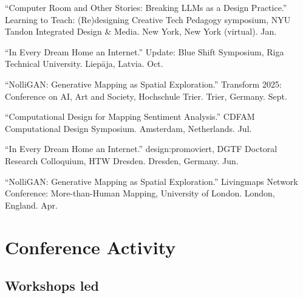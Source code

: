 \documentclass[11pt,letterpaper]{report} %
\begin{document}
\begin{tablist}

\item[2026] \tab{}\enquote{Computer Room and Other Stories: Breaking LLMs as a Design Practice.} Learning to Teach: (Re)designing Creative Tech Pedagogy symposium, NYU Tandon Integrated Design \& Media. New York, New York (virtual). Jan.

\item[2025] \tab{}\enquote{In Every Dream Home an Internet.} Update: Blue Shift Symposium, Riga Technical University. Liepāja, Latvia. Oct.

\item[2025] \tab{}\enquote{NolliGAN: Generative Mapping as Spatial Exploration.} Transform 2025: Conference on AI, Art and Society, Hochschule Trier. Trier, Germany. Sept.

\item[2025] \tab{}\enquote{Computational Design for Mapping Sentiment Analysis.} CDFAM Computational Design Symposium. Amsterdam, Netherlands. Jul.

\item[2025] \tab{}\enquote{In Every Dream Home an Internet.} design:promoviert, DGTF Doctoral Research Colloquium, HTW Dresden. Dresden, Germany. Jun.

\item[2025] \tab{}\enquote{NolliGAN: Generative Mapping as Spatial Exploration.} Livingmaps Network Conference: More-than-Human Mapping, University of London. London, England. Apr.

\end{tablist}

\section*{Conference Activity}

\subsection*{Workshops led}
\end{document}
